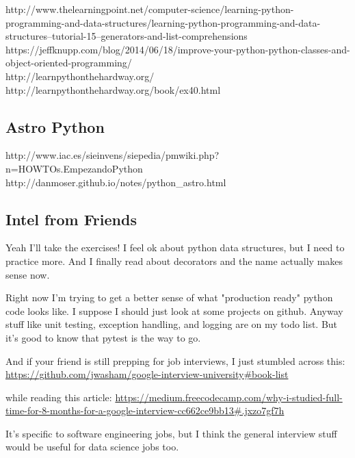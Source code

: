 \documentclass[11pt,a4paper]{article}
\begin{document}
\noindent
http://www.thelearningpoint.net/computer-science/learning-python-programming-and-data-structures/learning-python-programming-and-data-structures--tutorial-15--generators-and-list-comprehensions\\
https://jeffknupp.com/blog/2014/06/18/improve-your-python-python-classes-and-object-oriented-programming/\\
http://learnpythonthehardway.org/\\
http://learnpythonthehardway.org/book/ex40.html\\


\subsection*{Astro Python}
http://www.iac.es/sieinvens/siepedia/pmwiki.php?n=HOWTOs.EmpezandoPython \\
http://danmoser.github.io/notes/python\_astro.html \\


\subsection{Intel from Friends}

Yeah I'll take the exercises! I feel ok about python data structures, but I need to practice more. And I finally read about decorators and the name actually makes sense now. 

Right now I'm trying to get a better sense of what "production ready" python code looks like. I suppose I should just look at some projects on github. Anyway stuff like unit testing, exception handling, and logging are on my todo list. But it's good to know that pytest is the way to go. 

And if your friend is still prepping for job interviews, I just stumbled across this: 
\href{https://github.com/jwasham/google-interview-university#book-list}{https://github.com/jwasham/google-interview-university\#book-list}

while reading this article: 
\href{https://medium.freecodecamp.com/why-i-studied-full-time-for-8-months-for-a-google-interview-cc662ce9bb13#.jxzo7gf7h}{https://medium.freecodecamp.com/why-i-studied-full-time-for-8-months-for-a-google-interview-cc662ce9bb13\#.jxzo7gf7h}

It's specific to software engineering jobs, but I think the general interview stuff would be useful for data science jobs too. 
\end{document}
